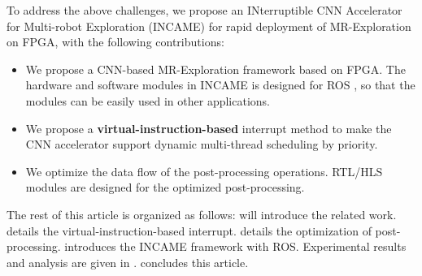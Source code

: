 To address the above challenges, we propose an INterruptible CNN Accelerator for Multi-robot Exploration (INCAME) for rapid deployment of MR-Exploration on FPGA, with the following contributions:

\begin{itemize}
\item We propose a CNN-based MR-Exploration framework based on FPGA. The hardware and software modules in INCAME is designed for ROS \cite{quigley2009ros}, so that the modules can be easily used in other applications.
\item We propose a \textbf{virtual-instruction-based} interrupt method to make the CNN accelerator support dynamic multi-thread scheduling by priority.
\item We optimize the data flow of the post-processing operations. RTL/HLS modules are designed for the optimized post-processing.
\end{itemize}

The rest of this article is organized as follows:  will introduce the related work.  details the {virtual-instruction-based} interrupt.  details the optimization of post-processing.  introduces the INCAME framework with ROS. Experimental results and analysis are given in .  concludes this article.